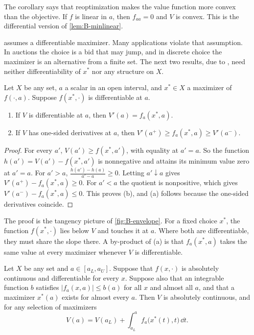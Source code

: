 The corollary says that reoptimization makes the value function more convex than the objective. If $f$ is linear
in $a$, then $f_{aa} = 0$ and $V$ is convex. This is the differential version of \cref{lem:B-minlinear}.

 assumes a differentiable maximizer. Many applications violate that assumption. In auctions the
choice is a bid that may jump, and in discrete choice the maximizer is an alternative from a finite set. The next two
results, due to \citet{MilgromSegal2002}, need neither differentiability of $x^*$ nor any structure on $X$.

\begin{theorem}\label{thm:B-envelope-ms}
Let $X$ be any set, $a$ a scalar in an open interval, and $x^* \in X$ a maximizer of $f(\cdot, a)$. Suppose $f(x^*, \cdot)$
is differentiable at $a$.
\begin{enumerate}[label=(\alph*)]
  \item If $V$ is differentiable at $a$, then $V'(a) = f_a(x^*, a)$.
  \item If $V$ has one-sided derivatives at $a$, then $V'(a^+) \geq f_a(x^*, a) \geq V'(a^-)$.
\end{enumerate}
\end{theorem}

\begin{proof}
For every $a'$, $V(a') \geq f(x^*, a')$, with equality at $a' = a$. So the function $h(a') = V(a') - f(x^*, a')$ is
nonnegative and attains its minimum value zero at $a' = a$. For $a' > a$, $\frac{h(a') - h(a)}{a' - a} \geq 0$. Letting
$a' \downarrow a$ gives $V'(a^+) - f_a(x^*, a) \geq 0$. For $a' < a$ the quotient is nonpositive, which gives
$V'(a^-) - f_a(x^*, a) \leq 0$. This proves (b), and (a) follows because the one-sided derivatives coincide.
\end{proof}

The proof is the tangency picture of \cref{fig:B-envelope}. For a fixed choice $x^*$, the function $f(x^*, \cdot)$ lies
below $V$ and touches it at $a$. Where both are differentiable, they must share the slope there. A by-product of (a) is
that $f_a(x^*, a)$ takes the same value at every maximizer whenever $V$ is differentiable.

\begin{theorem}\label{thm:B-envelope-integral}
Let $X$ be any set and $a \in [a_L, a_U]$. Suppose that $f(x, \cdot)$ is absolutely continuous and differentiable for
every $x$. Suppose also that an integrable function $b$ satisfies $|f_a(x, a)| \leq b(a)$ for all $x$ and almost all $a$,
and that a maximizer $x^*(a)$ exists for almost every $a$. Then $V$ is absolutely continuous, and for any selection of
maximizers
\begin{equation}\label{eq:B-envelope-integral}
V(a) = V(a_L) + \int_{a_L}^{a}f_a\big(x^*(t), t\big)\,\dd t .
\end{equation}
\end{theorem}

